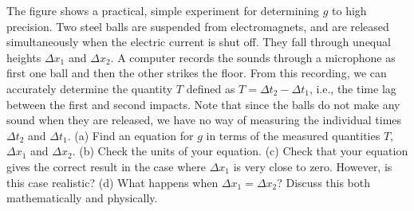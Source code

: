  The figure shows a practical, simple experiment for
determining $g$ to high precision. Two steel balls are
suspended from electromagnets, and are released simultaneously
when the electric current is shut off. They fall through
unequal heights $\Delta x_1$ and $\Delta x_2$. A computer
records the sounds through a microphone as first one ball
and then the other strikes the floor. From this recording,
we can accurately determine the quantity $T$ defined as
$T=\Delta t_2-\Delta t_1$, i.e., the time lag between the
first and second impacts.  Note that since the balls do not
make any sound when they are released, we have no way of
measuring the individual times $\Delta t_2$ and $\Delta t_1$.\hwendpart
(a) Find an equation for $g$ in terms of the measured
quantities $T$, $\Delta x_1$ and $\Delta x_2$.\answercheck\hwendpart
(b) Check the
units of your equation.\hwendpart
(c) Check that your equation gives
the correct result in the case where $\Delta x_1$ is very
close to zero. However, is this case realistic?\hwendpart
(d) What
happens when $\Delta x_1=\Delta x_2$? Discuss this both
mathematically and physically.
